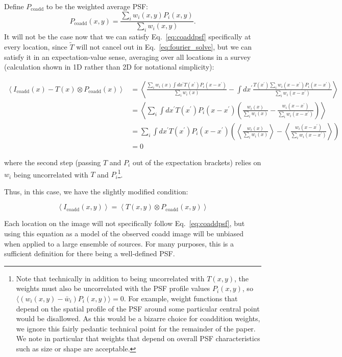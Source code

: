 \documentclass{openjournal}
\newcommand{\irresponse}[1]{{#1}}
\newcommand{\refresponse}[1]{#1}
\begin{document}
\begin{itemize}
    Define $P_\text{coadd}$ to be the weighted average PSF:
    \begin{equation}\label{eq:varweightpsf}
        P_\text{coadd}(x,y) = \frac{\sum_i w_i(x,y) P_i(x,y)}{\sum_i w_i(x,y)}.
    \end{equation}
    It will not be the case now that we can satisfy Eq.~\eqref{eq:coaddpsf} specifically at every location, since $\widetilde{T}$ will not cancel out in Eq.~\eqref{eq:fourier_solve}, but we can satisfy it in an expectation-value sense, averaging over all locations in a survey (calculation shown in 1D rather than 2D for notational simplicity):
    \begin{linenomath}\begin{align*}
      \left\langle I_\text{coadd}(x) - T(x) \otimes P_\text{coadd}(x) \right\rangle
      &= \left\langle \frac{
                  \sum_i w_i(x) \int dx^\prime  T(x^\prime) P_i(x-x^\prime)  }{\sum_i w_i(x)} 
                  - \int\! dx^\prime  \frac{T(x^\prime) \sum_i w_i(x-x^\prime) P_i(x-x^\prime)}{\sum_i w_i(x-x^\prime)} \right\rangle \\
      &= \left\langle
                  \sum_i \int\! dx^\prime  T(x^\prime) P_i(x-x^\prime) \left(\frac{w_i(x)}{\sum_i w_i(x)} - \frac{w_i(x-x^\prime)}{\sum_i w_i(x-x^\prime)}\right) \right\rangle \\
      &=
                  \sum_i \int\! dx^\prime  T(x^\prime) P_i(x-x^\prime)
                  \left( \left\langle \frac{w_i(x)}{\sum_i w_i(x)}\right\rangle - \left\langle\frac{w_i(x-x^\prime)}{\sum_i w_i(x-x^\prime)}\right\rangle \right)\\
      &= 0
    \end{align*}\end{linenomath}
    where the second step (passing $T$ and $P_i$ out of the expectation brackets) relies on $w_i$ being uncorrelated with $T$ and $P_i$\footnote{\irresponse{Note that technically in addition to being uncorrelated with $T(x,y)$, the weights must also be uncorrelated with the PSF profile values $P_i(x,y)$, so $\langle (w_i(x,y)-\bar w_i) P_i(x,y) \rangle = 0$. For example, weight functions that depend on the spatial profile of the PSF around some particular central point would be disallowed. As this would be a bizarre choice for coaddition weights, we ignore this fairly pedantic technical point for the remainder of the paper. We note in particular that weights that depend on overall PSF characteristics such as size or shape are acceptable.}}.
    
    Thus, in this case, we have the slightly modified condition:
    \begin{linenomath}\begin{equation}\label{eq:expcoaddpsf}
        \left\langle I_\text{coadd}(x,y) \right\rangle = \left\langle T(x,y) \otimes P_\text{coadd}(x,y) \right\rangle
    \end{equation}\end{linenomath}
    Each location on the image will not specifically follow Eq.~\eqref{eq:coaddpsf}, but using this equation as a model of the observed coadd image will be unbiased when applied to a large ensemble of sources.  For \refresponse{many} purposes, this is a sufficient definition for there being a well-defined PSF.


\end{itemize}
\end{document}
